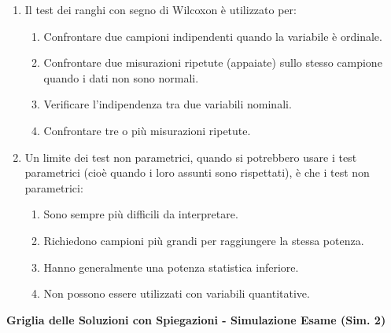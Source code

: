 \documentclass[12pt, a4paper]{article}
\begin{document}
\begin{enumerate}[resume]
    \item Il test dei ranghi con segno di Wilcoxon è utilizzato per:
    \begin{enumerate}
        \item Confrontare due campioni indipendenti quando la variabile è ordinale.
        \item Confrontare due misurazioni ripetute (appaiate) sullo stesso campione quando i dati non sono normali.
        \item Verificare l'indipendenza tra due variabili nominali.
        \item Confrontare tre o più misurazioni ripetute.
    \end{enumerate}
    \vspace{0.3cm}

    \item Un limite dei test non parametrici, quando si potrebbero usare i test parametrici (cioè quando i loro assunti sono rispettati), è che i test non parametrici:
    \begin{enumerate}
        \item Sono sempre più difficili da interpretare.
        \item Richiedono campioni più grandi per raggiungere la stessa potenza.
        \item Hanno generalmente una potenza statistica inferiore.
        \item Non possono essere utilizzati con variabili quantitative.
    \end{enumerate}
    \vspace{0.3cm}
\end{enumerate}

\newpage
\begin{center}
    \Large\textbf{Griglia delle Soluzioni con Spiegazioni - Simulazione Esame (Sim. 2)}
\end{center}
\vspace{1cm}
\end{document}
